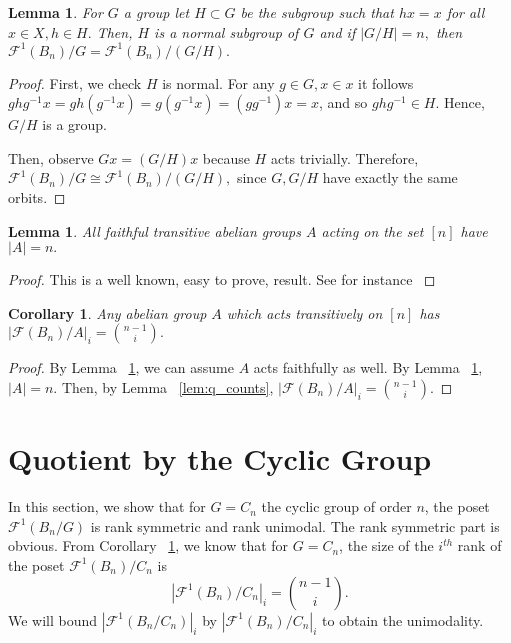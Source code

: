 \documentclass{amsart}
\newtheorem{cor}[thm]{Corollary}
\newtheorem{lem}[thm]{Lemma}
\theoremstyle{remark}
\begin{document}
\begin{lem}
\label{lem:faithful_action}
For $G$ a group let $H \subset G$ be the subgroup such that $hx = x$ for all $x \in X,h \in H.$ Then, $H$ is a normal subgroup of $G$ and if $|G/H| = n,$ then $\mathcal F^1(B_n)/G =\mathcal F^1(B_n)/(G/H).$
\end{lem}
\begin{proof}
First, we check $H$ is normal. For any $g \in G,x \in x$ it follows $ghg^{-1}x = gh(g^{-1}x) = g(g^{-1}x) = (gg^{-1})x = x$, and so $ghg^{-1} \in H.$ Hence, $G/H$ is a group.

Then, observe $Gx = (G/H)x$ because $H$ acts trivially. Therefore, $\mathcal F^1(B_n)/G \cong \mathcal F^1(B_n)/(G/H),$ since $G,G/H$ have exactly the same orbits.
\end{proof}

\begin{lem}
\label{lem:transitive_abelian}
All faithful transitive abelian groups $A$ acting on the set $[n]$ have $|A| = n.$
\end{lem}
\begin{proof}
This is a well known, easy to prove, result. See for instance \cite{stack}
\end{proof}

\begin{cor}
\label{cor:transitive_abelian_ranks}
Any abelian group $A$ which acts transitively on $[n]$ has $|\mathcal F (B_n)/A|_i= \binom{n-1}{i}.$
\end{cor}
\begin{proof}
By Lemma ~\ref{lem:faithful_action}, we can assume $A$ acts faithfully as well.
By Lemma ~\ref{lem:transitive_abelian}, $|A| = n.$ Then, by Lemma ~\ref{lem:q_counts}, $|\mathcal F (B_n)/A|_i = \binom{n-1}{i}.$
\end{proof}






\section{Quotient by the Cyclic Group}
\label{sec:cyclic}

In this section, we show that for $G = C_n$ the cyclic group of order $n$, the poset $\mathcal F^1(B_n/G)$ is rank symmetric and rank unimodal. The rank symmetric part is obvious. From Corollary ~\ref{cor:transitive_abelian_ranks}, we know that for $G = C_n$, the size of the $i^{th}$ rank of the poset $\mathcal F^1 (B_n)/C_n$ is $$|\mathcal F^1 (B_n)/C_n|_{i} = \binom{n-1}{i}.$$
We will bound $|\mathcal F^1(B_n/C_n)|_{i}$ by  $|\mathcal F^1 (B_n)/C_n|_{i}$ to obtain the unimodality. 
\end{document}
